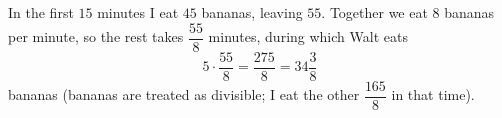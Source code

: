 In the first $15$ minutes I eat $45$ bananas, leaving $55$. Together we eat $8$ bananas per minute, so the rest takes $\dfrac{55}{8}$ minutes, during which Walt eats
\[
5\cdot\dfrac{55}{8}=\boxed{\dfrac{275}{8}}=34\dfrac{3}{8}
\]
bananas (bananas are treated as divisible; I eat the other $\dfrac{165}{8}$ in that time).
